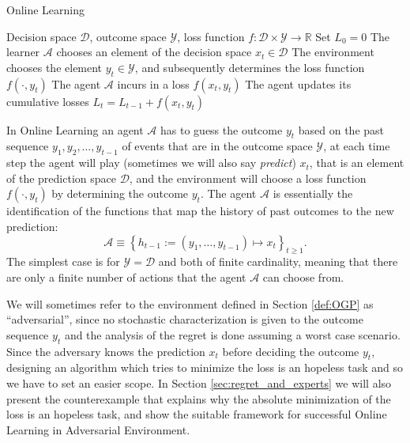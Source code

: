 \begin{algorithm}[ht!]
    \caption{Online Learning} 
    \label{alg:OL}
    \begin{algorithmic}[1]
    \REQUIRE Decision space $\mathcal D$, outcome space $\mathcal Y$, loss function $f:\mathcal D\times\mathcal Y\to\mathbb R$ \nonumber
    \STATE Set $L_0=0$
    \STATE The learner $\mathcal A$ chooses an element of the decision space $x_t\in\mathcal D$
    \STATE The environment chooses the element $y_t\in\mathcal Y$, and subsequently determines the loss function $f(\cdot,y_t)$
    \STATE The agent $\mathcal A$ incurs in a loss $f(x_t,y_t)$
    \STATE The agent updates its cumulative losses $L_t=L_{t-1}+f(x_t,y_t)$
    \ENDFOR
    \end{algorithmic}
\end{algorithm}


In Online Learning an agent $\mathcal A$ has to guess the outcome $y_t$ based on the past sequence $y_1,y_2,\ldots,y_{t-1}$ of events that are in the outcome space $\mathcal Y$, at each time step the agent will play (sometimes we will also say \emph{predict}) $x_t$, that is an element of the prediction space $\mathcal D$, and the environment will choose a loss function $f(\cdot,y_t)$ by determining the outcome $y_t$.
The agent $\mathcal A$ is essentially the identification of the functions that map the history of past outcomes to the new prediction:
$$\mathcal A\equiv\left\{h_{t-1}:=(y_1,\ldots,y_{t-1})\longmapsto x_t\right\}_{t\ge 1}. $$
The simplest case is for $\mathcal Y=\mathcal D$ and both of finite cardinality, meaning that there are only a finite number of actions that the agent $\mathcal A$ can choose from.

We will sometimes refer to the environment defined in Section \ref{def:OGP} as ``adversarial'', since no stochastic characterization is given to the outcome sequence $y_t$ and the analysis of the regret is done assuming a worst case scenario.
Since the adversary knows the prediction $x_t$ before deciding the outcome $y_t$, designing an algorithm which tries to minimize the loss is an hopeless task and so we have to set an easier scope. In Section \ref{sec:regret_and_experts} we will also present the counterexample that explains why the absolute minimization of the loss is an hopeless task, and show the suitable framework for successful Online Learning in Adversarial Environment.


